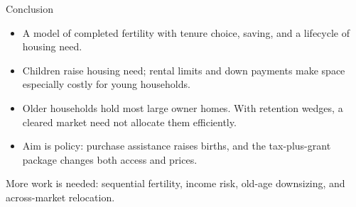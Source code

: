 \documentclass[aspectratio=169,11pt]{beamer}
\newcommand{\source}[1]{}
\newcommand{\tightitems}{\setlength{\itemsep}{0.55em}}
\newcommand{\1}{\mathbf 1}
\begin{document}
\begin{frame}{Conclusion}
  \large
  \begin{itemize}\tightitems
    \item A model of completed fertility with tenure choice, saving, and a lifecycle of housing need.
    \item Children raise housing need; rental limits and down payments make space especially costly for young households.
    \item Older households hold most large owner homes. With retention wedges, a cleared market need not allocate them efficiently.
    \item Aim is policy: purchase assistance raises births, and the tax-plus-grant package changes both access and prices.
  \end{itemize}

  \vspace{0.5em}
  \alert{More work is needed:} sequential fertility, income risk, old-age downsizing, and across-market relocation.
  \source{Circulated note, Conclusion and limitations.}
\end{frame}
\end{document}
